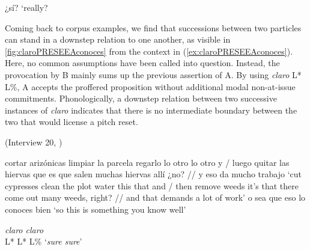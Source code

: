 \begin{exe}
	\ex \label{ex:claroPRESEEAcabeceraHYPO}
	\begin{xlist}[A:]
	 ¿sí?
	\glt `really?
	\end{xlist}
	\begin{xlist}
		
	
	\end{xlist}
\end{exe}

Coming back to corpus examples, we find that successions between two particles can stand in a downstep relation to one another, as visible in \autoref{fig:claroPRESEEAconoces} from the context in (\ref{ex:claroPRESEEAconoces}). Here, no common assumptions have been called into question. Instead, the provocation by B mainly sums up the previous assertion of A. By using \textit{claro} L* L\%, A accepts the proffered proposition without additional modal non-at-issue commitments. Phonologically, a downstep relation between two successive instances of \textit{claro} indicates that there is no intermediate boundary between the two that would license a pitch reset.

\begin{exe}
	\ex (Interview 20, \cite{PRESEEA.20142020})  \label{ex:claroPRESEEAconoces}
	\begin{xlist}[A:]
	 cortar arizónicas limpiar la parcela regarlo lo otro lo otro y / luego quitar las hiervas que es que salen muchas hiervas allí ¿no? // y eso da mucho trabajo 
	\glt `cut cypresses clean the plot water this that and / then remove weeds it's that there come out many weeds, right? // and that demands a lot of work'
	 o sea que eso lo conoces bien 
	\glt `so this is something you know well'

	 \textit{claro claro} \\
	\hspace*{.5em}L* \hspace{1em}L* L\%
	\glt `\textit{sure sure}'
	\end{xlist}
\end{exe}

